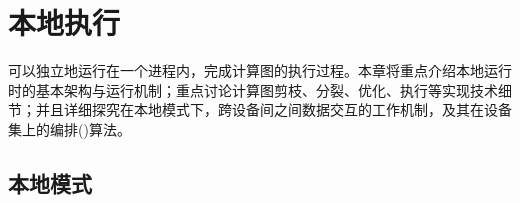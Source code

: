\begin{savequote}[45mm]
\end{savequote}

\chapter{本地执行} 
\label{ch:local}

\begin{content}

\tf{}可以独立地运行在一个进程内，完成计算图的执行过程。本章将重点介绍本地运行时的基本架构与运行机制；重点讨论计算图剪枝、分裂、优化、执行等实现技术细节；并且详细探究在本地模式下，跨设备间之间数据交互的工作机制，及其在设备集上的编排()算法。

\end{content}

\section{本地模式}
\label{sec:local-runtime}

